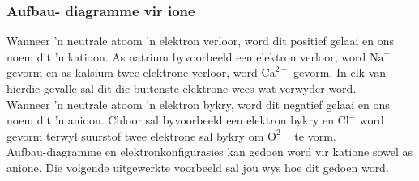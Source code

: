 \subsubsection*{Aufbau- diagramme vir ione}
Wanneer  'n neutrale atoom  'n elektron verloor, word dit positief gelaai en ons noem dit  'n katioon. As natrium byvoorbeeld een elektron verloor, word $\text{Na}^{+}$ gevorm en as kalsium twee elektrone verloor, word $\text{Ca}^{2+}$ gevorm. In elk van hierdie gevalle sal dit die buitenste elektrone wees wat verwyder word.\\
Wanneer  'n neutrale atoom  'n elektron bykry, word dit negatief gelaai en ons noem dit  'n anioon. Chloor sal byvoorbeeld een elektron bykry en $\text{Cl}^{-}$ word gevorm terwyl suurstof twee elektrone sal bykry om $\text{O}^{2-}$ te vorm. \\
Aufbau-diagramme en elektronkonfigurasies kan gedoen word vir katione sowel as anione. Die volgende uitgewerkte voorbeeld sal jou wys hoe dit gedoen word.
